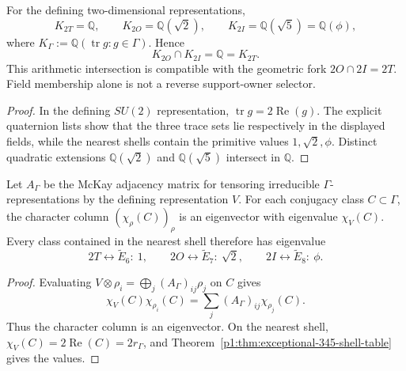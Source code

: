 \documentclass[11pt]{article}
\begin{document}
\begin{corollary}
\label{p1:cor:exceptional-defining-trace-fields}
For the defining two-dimensional representations,
\begin{equation}
\label{p1:eq:exceptional-defining-trace-fields}
 \boxed{K_{2T}=\mathbb Q,\qquad
 K_{2O}=\mathbb Q(\sqrt2),\qquad
 K_{2I}=\mathbb Q(\sqrt5)=\mathbb Q(\phi),}
\end{equation}
where \(K_\Gamma:=\mathbb Q(\operatorname{tr}g:g\in\Gamma)\).  Hence
\[
 K_{2O}\cap K_{2I}=\mathbb Q=K_{2T}.
\]
This arithmetic intersection is compatible with the geometric fork
\(2O\cap2I=2T\).  Field membership alone is not a reverse support-owner
selector.
\end{corollary}

\begin{proof}
In the defining \(SU(2)\) representation,
\(\operatorname{tr}g=2\operatorname{Re}(g)\).  The explicit quaternion
lists show that the three trace sets lie respectively in the displayed
fields, while the nearest shells contain the primitive values
\(1,\sqrt2,\phi\).  Distinct quadratic extensions
\(\mathbb Q(\sqrt2)\) and \(\mathbb Q(\sqrt5)\) intersect in \(\mathbb Q\).
\end{proof}

\begin{proposition}
\label{p1:prop:exceptional-shell-mckay-eigenvalues}
Let \(A_\Gamma\) be the McKay adjacency matrix for tensoring irreducible
\(\Gamma\)-representations by the defining representation \(V\).  For each
conjugacy class \(C\subset\Gamma\), the character column
\((\chi_\rho(C))_\rho\) is an eigenvector with eigenvalue \(\chi_V(C)\).
Every class contained in the nearest shell therefore has eigenvalue
\begin{equation}
\label{p1:eq:exceptional-shell-mckay-eigenvalues}
 \boxed{2T\leftrightarrow\widetilde E_6:\ 1,\qquad
 2O\leftrightarrow\widetilde E_7:\ \sqrt2,\qquad
 2I\leftrightarrow\widetilde E_8:\ \phi.}
\end{equation}
\end{proposition}

\begin{proof}
Evaluating
\(V\otimes\rho_i=\bigoplus_j(A_\Gamma)_{ij}\rho_j\) on \(C\) gives
\[
 \chi_V(C)\chi_{\rho_i}(C)
 =\sum_j(A_\Gamma)_{ij}\chi_{\rho_j}(C).
\]
Thus the character column is an eigenvector.  On the nearest shell,
\(\chi_V(C)=2\operatorname{Re}(C)=2r_\Gamma\), and
Theorem~\ref{p1:thm:exceptional-345-shell-table} gives the values.
\end{proof}
\end{document}
